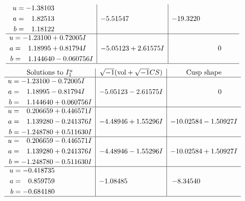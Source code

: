 \documentclass[1p]{elsarticle_modified}
\theoremstyle{definition}
\newcommand{\I}{\sqrt{-1}}
\begin{document}
$$\begin{array}{c|c|c}
\begin{aligned}
u &= -1.38103\phantom{ +0.000000I} \\
a &= \phantom{-}1.82513\phantom{ +0.000000I} \\
b &= \phantom{-}1.18122\phantom{ +0.000000I}\end{aligned}
 & -5.51547\phantom{ +0.000000I} & -19.3220\phantom{ +0.000000I} \\ \hline\begin{aligned}
u &= -1.23100 + 0.72005 I \\
a &= \phantom{-}1.18995 + 0.81794 I \\
b &= \phantom{-}1.144640 - 0.060756 I\end{aligned}
 & -5.05123 + 2.61575 I & \phantom{-0.000000 } 0\\
 \hline 
 \end{array}$$\newpage$$\begin{array}{c|c|c}  
\text{Solutions to }I^u_{1}& \I (\text{vol} + \sqrt{-1}CS) & \text{Cusp shape}\\
 \hline 
\begin{aligned}
u &= -1.23100 - 0.72005 I \\
a &= \phantom{-}1.18995 - 0.81794 I \\
b &= \phantom{-}1.144640 + 0.060756 I\end{aligned}
 & -5.05123 - 2.61575 I & \phantom{-0.000000 } 0 \\ \hline\begin{aligned}
u &= \phantom{-}0.206659 + 0.446571 I \\
a &= \phantom{-}1.139280 - 0.241376 I \\
b &= -1.248780 + 0.511630 I\end{aligned}
 & -4.48946 + 1.55296 I & -10.02584 - 1.50927 I \\ \hline\begin{aligned}
u &= \phantom{-}0.206659 - 0.446571 I \\
a &= \phantom{-}1.139280 + 0.241376 I \\
b &= -1.248780 - 0.511630 I\end{aligned}
 & -4.48946 - 1.55296 I & -10.02584 + 1.50927 I \\ \hline\begin{aligned}
u &= -0.418735\phantom{ +0.000000I} \\
a &= \phantom{-}0.859759\phantom{ +0.000000I} \\
b &= -0.684180\phantom{ +0.000000I}\end{aligned}
 & -1.08485\phantom{ +0.000000I} & -8.34540\phantom{ +0.000000I}\\
 \hline 
 \end{array}$$\newpage
\end{document}
